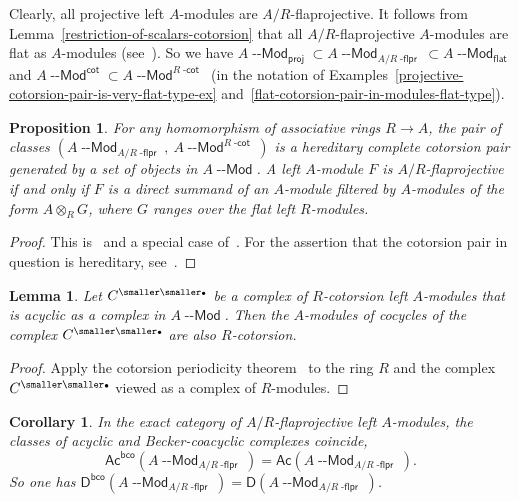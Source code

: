 \documentclass[12pt,a4paper]{amsart}
\newcommand{\+}{\nobreakdash-}
\renewcommand{\:}{\colon}
\newcommand{\rarrow}{\longrightarrow}
\newcommand{\ot}{\otimes}
\newcommand{\bu}{{\text{\smaller\smaller$\scriptstyle\bullet$}}}
\newcommand{\Modl}{{\operatorname{\mathsf{--Mod}}}}
\newcommand{\sD}{\mathsf D}
\newcommand{\Ac}{\mathsf{Ac}}
\newcommand{\proj}{\mathsf{proj}}
\renewcommand{\flat}{\mathsf{flat}}
\renewcommand{\cot}{\mathsf{cot}}
\newcommand{\bco}{\mathsf{bco}}
\newcommand{\dcot}{{\operatorname{\mathsf{-cot}}}}
\newcommand{\dflpr}{{\operatorname{\mathsf{-flpr}}}}
\theoremstyle{plain}
\newtheorem{prop}[thm]{Proposition}
\newtheorem{lem}[thm]{Lemma}
\newtheorem{cor}[thm]{Corollary}
\theoremstyle{definition}
\begin{document}
 Clearly, all projective left $A$\+modules are $A/R$\+flaprojective.
 It follows from Lemma~\ref{restriction-of-scalars-cotorsion} that
all $A/R$\+flaprojective $A$\+modules are flat as $A$\+modules
(see~\cite[Remark~1.29]{Pdomc}).
 So we have $A\Modl_\proj\subset A\Modl_{A/R\dflpr}\subset
A\Modl_\flat$ and $A\Modl^\cot\subset A\Modl^{R\dcot}$ (in the notation
of Examples~\ref{projective-cotorsion-pair-is-very-flat-type-ex}
and~\ref{flat-cotorsion-pair-in-modules-flat-type}).
{\par}

\begin{prop} \label{flaprojective-cotorsion-pair-prop}
 For any homomorphism of associative rings $R\rarrow A$, the pair of
classes $(A\Modl_{A/R\dflpr},\>A\Modl^{R\dcot})$ is a hereditary
complete cotorsion pair generated by a set of objects in $A\Modl$.
 A left $A$\+module $F$ is $A/R$\+flaprojective if and only if $F$ is
a direct summand of an $A$\+module filtered by $A$\+modules of
the form $A\ot_RG$, where $G$ ranges over the flat left $R$\+modules.
\end{prop}

\begin{proof}
 This is~\cite[Theorem~3.5]{PBas} and a special case
of~\cite[Proposition~3.3]{Pctrl}.
 For the assertion that the cotorsion pair in question is hereditary,
see~\cite[Lemma~1.30]{Pdomc}.
\end{proof}

\begin{lem} \label{R-cotorsion-A-module-periodicity-lemma}
 Let $C^\bu$ be a complex of $R$\+cotorsion left $A$\+modules that is
acyclic as a complex in $A\Modl$.
 Then the $A$\+modules of cocycles of the complex $C^\bu$ are
also $R$\+cotorsion.
\end{lem}

\begin{proof}
 Apply the cotorsion periodicity theorem~\cite[Theorem~5.1(2)]{BCE}
to the ring $R$ and the complex $C^\bu$ viewed as a complex of
$R$\+modules.
\end{proof}

\begin{cor} \label{flaprojective-coacyclic=acyclic}
 In the exact category of $A/R$\+flaprojective left $A$\+modules,
the classes of acyclic and Becker-coacyclic complexes coincide,
$$
 \Ac^\bco(A\Modl_{A/R\dflpr})=\Ac(A\Modl_{A/R\dflpr}).
$$
 So one has\/ $\sD^\bco(A\Modl_{A/R\dflpr})=
\sD(A\Modl_{A/R\dflpr})$.
\end{cor}
\end{document}
